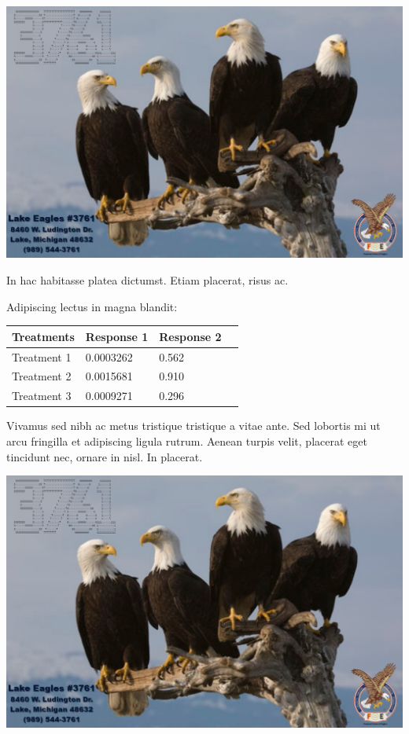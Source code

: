 \documentclass[a0,landscape]{a0poster}
\begin{document}
\begin{multicols}{4}
\begin{center}
\includegraphics[width=0.8\linewidth]{images/the_club2b}


\end{center}\vspace{1cm}

In hac habitasse platea dictumst. Etiam placerat, risus ac.

Adipiscing lectus in magna blandit:

\begin{center}\vspace{1cm}
\begin{tabular}{l l l l}
\toprule
\textbf{Treatments} & \textbf{Response 1} & \textbf{Response 2} \\
\midrule
Treatment 1 & 0.0003262 & 0.562 \\
Treatment 2 & 0.0015681 & 0.910 \\
Treatment 3 & 0.0009271 & 0.296 \\
\bottomrule
\end{tabular}
\end{center}\vspace{1cm}

Vivamus sed nibh ac metus tristique tristique a vitae ante. Sed lobortis mi ut arcu fringilla et adipiscing ligula rutrum. Aenean turpis velit, placerat eget tincidunt nec, ornare in nisl. In placerat.

\begin{center}\vspace{1cm}
\includegraphics[width=0.8\linewidth]{images/the_club2b}
\end{center}\vspace{1cm}


\end{multicols}
\end{document}
